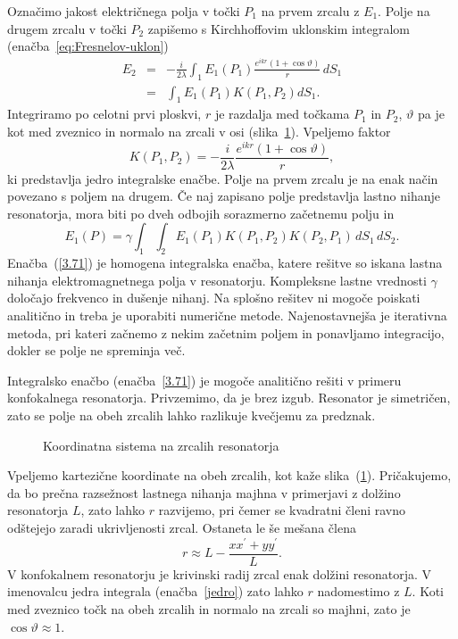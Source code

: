 Označimo jakost električnega polja v točki $P_{1}$ na prvem zrcalu z $E_{1}$.
Polje na drugem zrcalu v točki $P_2$ zapišemo s Kirchhoffovim uklonskim
integralom (enačba~\ref{eq:Fresnelov-uklon})
\begin{eqnarray}
E_{2} & = & -\frac{i}{2\lambda}\int_{1}E_{1}(P_{1})\frac{e^{ikr}(1+\cos\vartheta)}{r}\, dS_{1} \\
 & = & \int_{1}E_{1}(P_{1})K(P_{1},P_{2})dS_{1}.
\label{eq:resuklon}
\end{eqnarray}
Integriramo po celotni prvi ploskvi, $r$ je razdalja med točkama $P_{1}$ in $P_{2}$, $\vartheta$
pa je kot med zveznico in normalo na zrcali v osi (slika~\ref{fig:uklon_res_shema}). Vpeljemo faktor
\begin{equation}
K(P_{1},P_{2}) = -\frac{i}{2\lambda}\frac{e^{ikr}(1+\cos\vartheta)}{r},
\label{jedro}
\end{equation}
ki predstavlja jedro integralske enačbe. Polje na prvem zrcalu je 
na enak način povezano s poljem na drugem. Če naj zapisano polje predstavlja lastno nihanje
resonatorja, mora biti po dveh odbojih sorazmerno začetnemu polju in
\begin{equation}
E_{1}(P)=\gamma\int_{1}\int_{2}E_{1}(P_{1})K(P_{1},P_{2})K(P_{2},P_1)\, dS_{1}\, dS_{2}.
\label{3.71}
\end{equation}
Enačba~(\ref{3.71}) je homogena integralska enačba, katere
rešitve so iskana lastna nihanja elektromagnetnega polja v resonatorju.
Kompleksne lastne vrednosti $\gamma$ določajo frekvenco in dušenje
nihanj. Na splošno rešitev ni mogoče poiskati analitično in treba je uporabiti 
numerične metode. Najenostavnejša je iterativna
metoda, pri kateri začnemo z nekim začetnim poljem in ponavljamo integracijo, 
dokler se polje ne spreminja več.

Integralsko enačbo (enačba~\ref{3.71}) je mogoče analitično rešiti v primeru
konfokalnega resonatorja. Privzemimo, da je brez izgub. 
Resonator je simetričen, zato se polje na obeh zrcalih lahko razlikuje kvečjemu
za predznak.
\begin{figure}[h]
\centering
\def\svgwidth{100truemm} 

\caption{Koordinatna sistema na zrcalih resonatorja}
\label{fig:uklon_res_shema}
\end{figure}

Vpeljemo kartezične koordinate na obeh zrcalih, kot kaže slika~(\ref{fig:uklon_res_shema}).
Pričakujemo, da bo prečna razsežnost lastnega nihanja majhna v primerjavi
z dolžino resonatorja $L$, zato lahko $r$ razvijemo, pri čemer se kvadratni členi ravno odštejejo 
zaradi ukrivljenosti zrcal. Ostaneta le še mešana člena
\begin{equation}
r\approx L-\frac{xx^{\prime}+yy^{\prime}}{L}.
\label{3.72}
\end{equation}
V konfokalnem resonatorju je krivinski radij zrcal enak dolžini resonatorja.
V imenovalcu jedra integrala (enačba~\ref{jedro}) zato lahko $r$ nadomestimo
z $L$. Koti med zveznico točk na obeh zrcalih in normalo na zrcali
so majhni, zato je  $\cos\vartheta \approx 1$. 


